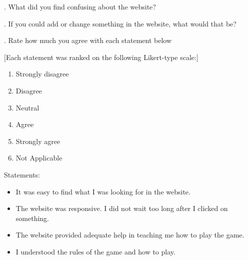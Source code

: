 \vspace{5 mm}
. What did you find confusing about the website?

\vspace{5 mm}
. If you could add or change something in the website, what would that be?

\vspace{5 mm}
. Rate how much you agree with each statement below

[Each statement was ranked on the following Likert-type scale:]

\begin{enumerate}
	\item Strongly disagree
	\item Disagree
	\item Neutral
	\item Agree
	\item Strongly agree
	\item Not Applicable
\end{enumerate}

\noindent
Statements:

\begin{itemize}
	\item It was easy to find what I was looking for in the website.
	\item The website was responsive. I did not wait too long after I clicked on something.
	\item The website provided adequate help in teaching me how to play the game.
	\item I understood the rules of the game and how to play.
\end{itemize}


